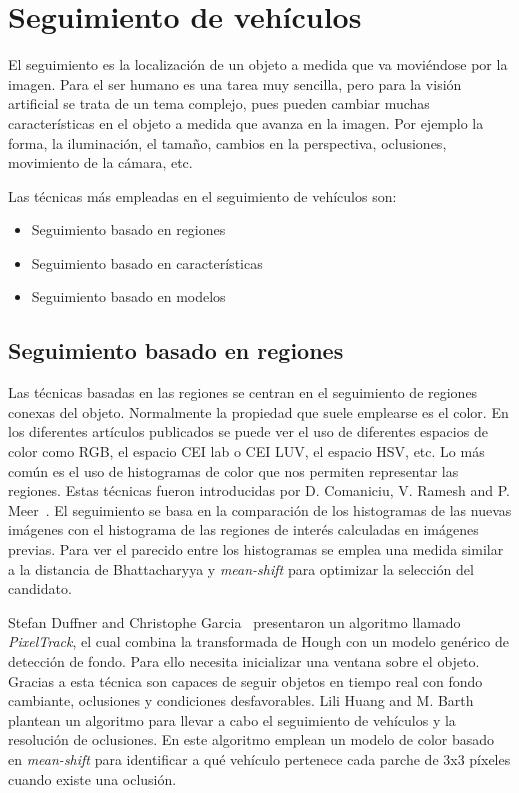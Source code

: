 \section{Seguimiento de vehículos}

El seguimiento es la localización de un objeto a medida que va moviéndose por la imagen. Para el ser humano es una tarea muy sencilla, pero para la visión artificial se trata de un tema complejo, pues pueden cambiar muchas características en el objeto  a medida que avanza en la imagen. Por ejemplo la forma, la iluminación, el tamaño, cambios en la perspectiva, oclusiones, movimiento de la cámara, etc.

Las técnicas más empleadas en el seguimiento de vehículos son:

\begin{itemize}
    \item Seguimiento basado en regiones
    \item Seguimiento basado en características
    \item Seguimiento basado en modelos
\end{itemize}

\subsection{Seguimiento basado en regiones}

Las técnicas basadas en las regiones se centran en el seguimiento de regiones conexas del objeto. Normalmente la propiedad que suele emplearse es el color. En los diferentes artículos publicados se puede ver el uso de diferentes espacios de color como RGB, el espacio CEI lab o CEI LUV, el espacio HSV, etc. Lo más común es el uso de histogramas de color que nos permiten representar las regiones. Estas técnicas fueron introducidas por D. Comaniciu, V. Ramesh and P. Meer~\cite{kernel_based_object}. El seguimiento se basa en la comparación de los histogramas de las nuevas imágenes con el histograma de las regiones de interés calculadas en imágenes previas. Para ver el parecido entre los histogramas se emplea una medida similar a la distancia de Bhattacharyya y \textit{mean-shift} para optimizar la selección del candidato.

Stefan Duffner and Christophe Garcia~\cite{pixeltrack} presentaron un algoritmo llamado \textit{PixelTrack}, el cual combina la transformada de Hough con un modelo genérico de detección de fondo. Para ello necesita inicializar una ventana sobre el objeto. Gracias a esta técnica son capaces de seguir objetos en tiempo real con fondo cambiante, oclusiones y condiciones desfavorables.
Lili Huang and M. Barth~\cite{real_time_vehicle} plantean un algoritmo para llevar a cabo el seguimiento de vehículos y la resolución de oclusiones. En este algoritmo emplean un modelo de color basado en \textit{mean-shift} para identificar a qué vehículo pertenece cada parche de 3x3 píxeles cuando existe una oclusión.

